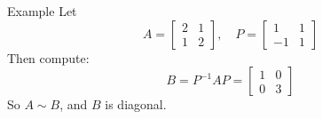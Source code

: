 \documentclass[11pt]{beamer}
\theoremstyle{plain}
\begin{document}
\begin{frame}{Example}
    Let
$$
A = \begin{bmatrix} 2 & 1 \\ 1 & 2 \end{bmatrix}, \quad
P = \begin{bmatrix} 1 & 1 \\ -1 & 1 \end{bmatrix}
$$
Then compute:
$$
B = P^{-1} A P = \begin{bmatrix} 1 & 0 \\ 0 & 3 \end{bmatrix}
$$
So $A \sim B$, and $B$ is diagonal.
\end{frame}
\end{document}
